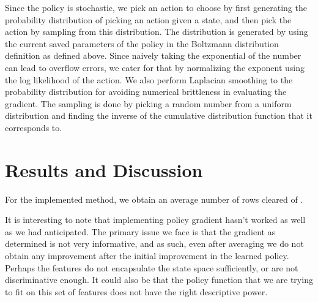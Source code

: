 \documentclass[11pt]{article}
\begin{document}
Since the policy is stochastic, we pick an action to choose by first generating the probability distribution of picking an action given a state, and then pick the action by sampling from this distribution. The distribution is generated by using the current saved parameters of the policy in the Boltzmann distribution definition as defined above. Since naively taking the exponential of the number can lead to overflow errors, we cater for that by normalizing the exponent using the log likelihood of the action. We also perform Laplacian smoothing to the probability distribution for avoiding numerical brittleness in evaluating the gradient. The sampling is done by picking a random number from a uniform distribution and finding the inverse of the cumulative distribution function that it corresponds to.


\section{Results and Discussion}
For the implemented method, we obtain an average number of rows cleared of .

It is interesting to note that implementing policy gradient hasn't worked as well as we had anticipated. The primary issue we face is that the gradient as determined is not very informative, and as such, even after averaging we do not obtain any improvement after the initial improvement in the learned policy. Perhaps the features do not encapsulate the state space sufficiently, or are not discriminative enough. It could also be that the policy function that we are trying to fit on this set of features does not have the right descriptive power. 
\end{document}
